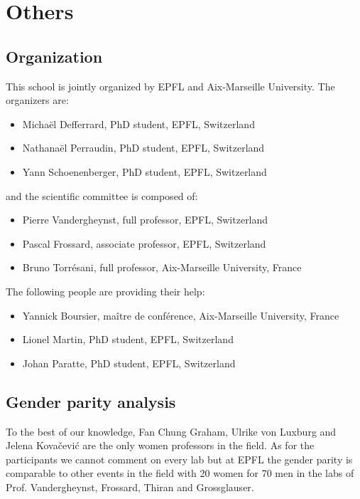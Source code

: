 \documentclass[a4paper]{scrartcl}
\begin{document}
\section{Others}

\subsection{Organization}

This school is jointly organized by EPFL and Aix-Marseille University. The
organizers are:
\begin{itemize}
	\setlength{\itemsep}{0pt} \setlength{\parskip}{0pt}
	\item Michaël Defferrard, PhD student, EPFL, Switzerland
	\item Nathanaël Perraudin, PhD student, EPFL, Switzerland
	\item Yann Schoenenberger, PhD student, EPFL, Switzerland
\end{itemize}
and the scientific committee is composed of:
\begin{itemize}
	\setlength{\itemsep}{0pt} \setlength{\parskip}{0pt}
	\item Pierre Vandergheynst, full professor, EPFL, Switzerland
	\item Pascal Frossard, associate professor, EPFL, Switzerland
	\item Bruno Torrésani, full professor, Aix-Marseille University, France
\end{itemize}
The following people are providing their help:
\begin{itemize}
	\setlength{\itemsep}{0pt} \setlength{\parskip}{0pt}
	\item Yannick Boursier, maître de conférence, Aix-Marseille University, France
	\item Lionel Martin, PhD student, EPFL, Switzerland
	\item Johan Paratte, PhD student, EPFL, Switzerland
\end{itemize}

\subsection{Gender parity analysis}

To the best of our knowledge, Fan Chung Graham, Ulrike von Luxburg and Jelena
Kovačević are the only women professors in the field. As for the participants we
cannot comment on every lab but at EPFL the gender parity is comparable to other
events in the field with 20 women for 70 men in the labs of Prof. Vandergheynst,
Frossard, Thiran and Grossglauser.
\end{document}
